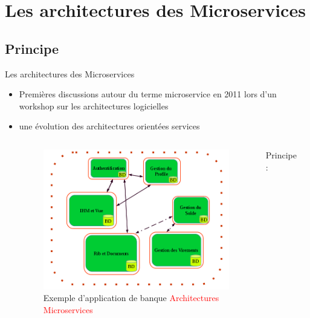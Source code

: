 \documentclass{beamer}
\begin{document}
\section{Les architectures des Microservices}
\subsection*{Principe}
\begin{frame}{Les architectures des Microservices}
    \begin{itemize}
     \item Premières discussions autour du terme microservice en 2011 lors d’un workshop sur les architectures logicielles
    \item une évolution des architectures orientées services
    \begin{columns}
        \begin{figure}
            \begin{center}
            \includegraphics[width=1\textwidth]{Microservices.png}
                \caption{Exemple d'application de banque \textcolor{red}{Architectures Microservices}}
            \end{center}
        \end{figure}
        Principe :
        \begin{itemize}

\end{itemize}
\end{columns}
\end{itemize}
\end{frame}
\end{document}
